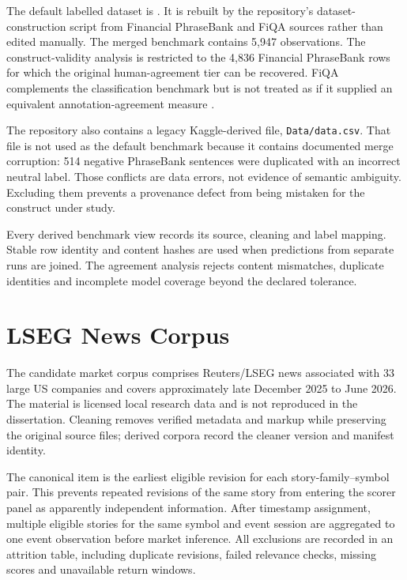 \documentclass[11pt,a4paper,oneside]{book}
\let\parencite\citep
\begin{document}
The default labelled dataset is .
It is rebuilt by the repository's dataset-construction script from Financial PhraseBank and FiQA sources rather than edited manually.
The merged benchmark contains 5,947 observations.
The construct-validity analysis is restricted to the 4,836 Financial PhraseBank rows for which the original human-agreement tier can be recovered.
FiQA complements the classification benchmark but is not treated as if it supplied an equivalent annotation-agreement measure \parencite{maia2018fiqa}.

The repository also contains a legacy Kaggle-derived file, \texttt{Data/data.csv}.
That file is not used as the default benchmark because it contains documented merge corruption: 514 negative PhraseBank sentences were duplicated with an incorrect neutral label.
Those conflicts are data errors, not evidence of semantic ambiguity.
Excluding them prevents a provenance defect from being mistaken for the construct under study.

Every derived benchmark view records its source, cleaning and label mapping.
Stable row identity and content hashes are used when predictions from separate runs are joined.
The agreement analysis rejects content mismatches, duplicate identities and incomplete model coverage beyond the declared tolerance.

\section{LSEG News Corpus}
\label{sec:data-lseg}

The candidate market corpus comprises Reuters/LSEG news associated with 33 large US companies and covers approximately late December 2025 to June 2026.
The material is licensed local research data and is not reproduced in the dissertation.
Cleaning removes verified metadata and markup while preserving the original source files; derived corpora record the cleaner version and manifest identity.

The canonical item is the earliest eligible revision for each story-family--symbol pair.
This prevents repeated revisions of the same story from entering the scorer panel as apparently independent information.
After timestamp assignment, multiple eligible stories for the same symbol and event session are aggregated to one event observation before market inference.
All exclusions are recorded in an attrition table, including duplicate revisions, failed relevance checks, missing scores and unavailable return windows.
\end{document}
